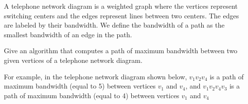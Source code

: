 A telephone network diagram is a weighted graph where the vertices
represent switching centers and the edges represent lines between two
centers.  The edges are labeled by their bandwidth. We define the
bandwidth of a path as the smallest bandwidth of an edge in the path.

Give an algorithm that computes a path of maximum bandwidth between
two given vertices of a telephone network diagram.
 
For example, in the telephone network diagram shown below, $v_1 v_2
v_4$ is a path of maximum bandwidth (equal to 5) between vertices
$v_1$ and $v_4$, and $v_1 v_2 v_4 v_3$ is a path of maximum bandwidth
(equal to 4) between vertices $v_1$ and $v_4$

\begin{figure}[h]
\centerline{}
\end{figure}

